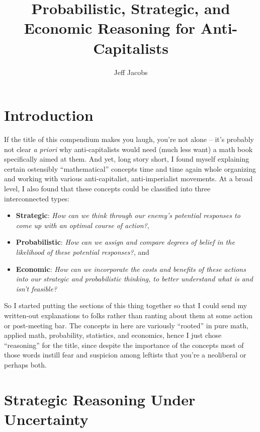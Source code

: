 \documentclass[12pt]{article}
\title{Probabilistic, Strategic, and Economic Reasoning for Anti-Capitalists}
\author{Jeff Jacobs}
\begin{document}
	
	\maketitle
	
	\section*{Introduction}
	
	\doublespacing
	
	If the title of this compendium makes you laugh, you're not alone -- it's probably not clear \textit{a priori} why anti-capitalists would need (much less want) a math book specifically aimed at them. And yet, long story short, I found myself explaining certain ostensibly ``mathematical'' concepts time and time again whole organizing and working with various anti-capitalist, anti-imperialist movements. At a broad level, I also found that these concepts could be classified into three interconnected types:
	\begin{itemize}
		\item \textbf{Strategic}: \textit{How can we think through our enemy's potential responses to come up with an optimal course of action?},
		\item \textbf{Probabilistic}: \textit{How can we assign and compare degrees of belief in the likelihood of these potential responses?}, and
		\item \textbf{Economic}: \textit{How can we incorporate the costs and benefits of these actions into our strategic and probabilistic thinking, to better understand what is and isn't feasible?}
	\end{itemize}
	So I started putting the sections of this thing together so that I could send my written-out explanations to folks rather than ranting about them at some action or post-meeting bar. The concepts in here are variously ``rooted'' in pure math, applied math, probability, statistics, and economics, hence I just chose ``reasoning'' for the title, since despite the importance of the concepts most of those words instill fear and suspicion among leftists that you're a neoliberal or perhaps both.
	
	
	
	
	
	
	
	\section{Strategic Reasoning Under Uncertainty}
	
\end{document}
